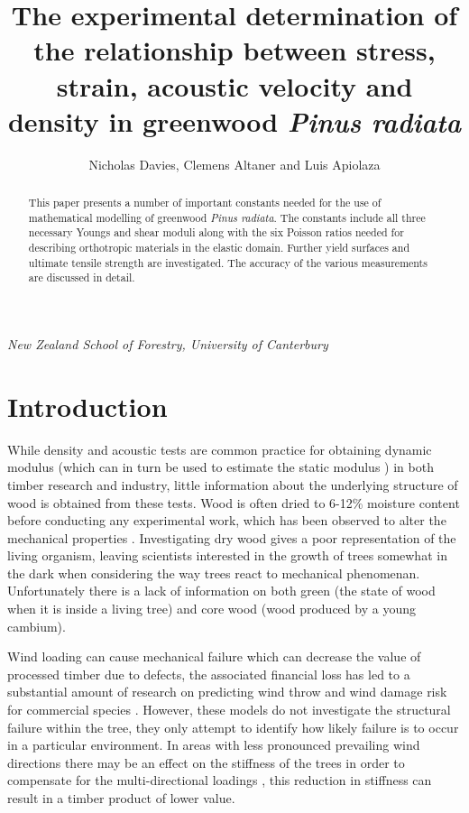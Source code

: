 \documentclass[10pt]{article}
\begin{document}
\begin{titlepage}
\title{The experimental determination of the relationship between stress, strain, acoustic velocity and density in greenwood \textit{Pinus radiata}}
\author{Nicholas Davies, Clemens Altaner and Luis Apiolaza}
\maketitle
\emph{New Zealand School of Forestry, University of Canterbury}
\begin{abstract}
This paper presents a number of important constants needed for the use of
 mathematical modelling of greenwood \textit{Pinus radiata}. The constants include all three necessary Youngs and shear
 moduli along with the six Poisson ratios needed for describing orthotropic materials in the elastic domain.
 Further yield surfaces and ultimate tensile strength are investigated. The accuracy of the various measurements are discussed in detail.
\end{abstract}

\thispagestyle{empty}
\end{titlepage}
\setcounter{page}{1}

\section{Introduction}
While density and acoustic tests are common practice for obtaining dynamic modulus (which can in turn be used to estimate
the static modulus \citep{barker_properties_1998,lindstrom_stiffness_2004}) in both timber research and industry, little
information about the underlying structure of wood is obtained from these tests. Wood is often dried to 6-12\% moisture
content before conducting any experimental work, which has been observed to alter the mechanical properties
\citep{skaar_springer_1988,ozyhar_moisture-dependent_2013}. Investigating dry wood gives a poor representation of the
living organism, leaving scientists interested in the growth of trees somewhat in the dark when considering the way trees
react to mechanical phenomenan. Unfortunately there is a lack of information on both green (the state of wood when it is inside
a living tree) and core wood (wood produced by a young cambium).

Wind loading can cause mechanical failure which can decrease the value of processed timber due to defects, the associated financial
loss has led to a substantial amount of research on predicting wind throw and wind damage risk for commercial species
\citep{gardiner_review_2008}. However, these models do not investigate the structural failure within the tree,
they only attempt to identify how likely failure is to occur in a particular environment. In areas with less pronounced
prevailing wind directions there may be an effect on the stiffness of the trees in order to compensate for the multi-directional
loadings \citep{apiolaza_characterization_2011,kern_mechanical_2005}, this reduction in stiffness can result in a timber product
of lower value.
\end{document}
